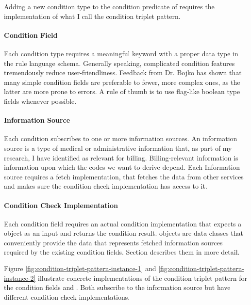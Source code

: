 Adding a new condition type to the condition predicate of \RL requires the implementation of what I call the condition triplet pattern.

\paragraph{Condition Field}
Each condition type requires a meaningful keyword with a proper data type in the rule language schema.
Generally speaking, complicated condition features tremendously reduce user-friendliness.
Feedback from Dr. Bojko has shown that many simple condition fields are preferable to fewer, more complex ones, as the latter are more prone to errors.
A rule of thumb is to use flag-like boolean type fields whenever possible.

\paragraph{Information Source}
Each condition subscribes to one or more information sources.
An information source is a type of medical or administrative information that, as part of my research, I have identified as relevant for billing.
Billing-relevant information is information upon which the codes we want to derive depend.
Each Information source requires a fetch implementation, that fetches the data from other \AV services and makes sure the condition check implementation has access to it.

\paragraph{Condition Check Implementation}
Each condition field requires an actual condition implementation that expects a  object as an input and returns the condition result.
 objects are data classes that conveniently provide the data that represents fetched information sources required by the existing condition fields.
Section \addref describes them in more detail.

Figure \ref{fig:condition-triplet-pattern-instance-1} and \ref{fig:condition-triplet-pattern-instance-2} illustrate concrete implementations of the condition triplet pattern
for the condition fields  and .
Both subscribe to the  information source but have different condition check implementations.



